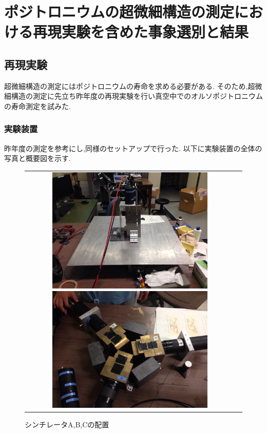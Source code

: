 \chapter{ポジトロニウムの超微細構造の測定における再現実験を含めた事象選別と結果}\label{result}

\section{再現実験}
超微細構造の測定にはポジトロニウムの寿命を求める必要がある.
そのため,超微細構造の測定に先立ち昨年度の再現実験を行い真空中でのオルソポジトロニウムの寿命測定を試みた.

\subsection{実験装置}
昨年度の測定を参考にし,同様のセットアップで行った.
以下に実験装置の全体の写真と概要図を示す.
\begin{figure}[htbp]
	\begin{tabular}{cc}
		\begin{minipage}{0.5\hsize}
			\centering
				\includegraphics[width=80mm]{img/isb/setting_overview.JPG}
				\caption{装置の全体写真}
				\label{fig:setting2015}
		\end{minipage}
		\begin{minipage}{0.5\hsize}
			\centering
				\includegraphics[width=80mm]{img/isb/pmt_setting}
				\caption{シンチレータA,B,Cの配置}
				\label{fig:pmt_setting2015}
		\end{minipage}
	\end{tabular}
\end{figure}

